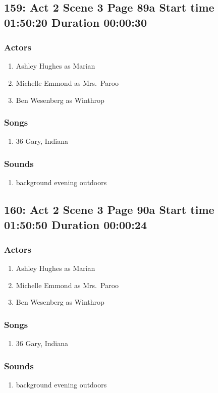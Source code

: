 \subsection{159: Act 2 Scene 3 Page 89a Start time 01:50:20 Duration 00:00:30}

\subsubsection{Actors}
\begin{enumerate}
\item Ashley Hughes as Marian
\item Michelle Emmond as Mrs.~Paroo
\item Ben Wesenberg as Winthrop
\end{enumerate}

\subsubsection{Songs}
\begin{enumerate}
\item 36 Gary, Indiana
\end{enumerate}\subsubsection{Sounds}
\begin{enumerate}
\item background evening outdoors
\end{enumerate}
\subsection{160: Act 2 Scene 3 Page 90a Start time 01:50:50 Duration 00:00:24}

\subsubsection{Actors}
\begin{enumerate}
\item Ashley Hughes as Marian
\item Michelle Emmond as Mrs.~Paroo
\item Ben Wesenberg as Winthrop
\end{enumerate}

\subsubsection{Songs}
\begin{enumerate}
\item 36 Gary, Indiana
\end{enumerate}\subsubsection{Sounds}
\begin{enumerate}
\item background evening outdoors
\end{enumerate}
